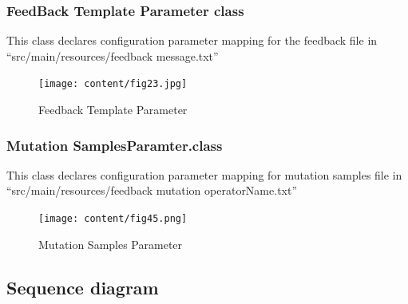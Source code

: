 \subsubsection{FeedBack Template Parameter class}
This class declares configuration parameter mapping for the feedback file in “src/main/resources/feedback message.txt”
\begin{figure}[h!]
	\centering
	\texttt{[image: content/fig23.jpg]}
	\caption{Feedback Template Parameter}
	\label{fig:f11}
\end{figure}
\subsubsection{Mutation SamplesParamter.class}
This class declares configuration parameter mapping for mutation samples file in “src/main/resources/feedback mutation operatorName.txt”
\begin{figure}[h!]
	\centering
	\texttt{[image: content/fig45.png]}
	\caption{Mutation Samples Parameter}
	\label{fig:f45}
\end{figure}

\subsection{Sequence diagram}
